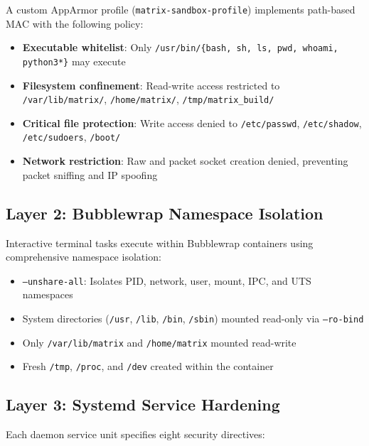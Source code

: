 \documentclass[conference]{IEEEtran}
\begin{document}
A custom AppArmor profile (\texttt{matrix-sandbox-profile}) implements path-based MAC with the following policy:

\begin{itemize}
    \item \textbf{Executable whitelist}: Only \texttt{/usr/bin/\{bash, sh, ls, pwd, whoami, python3*\}} may execute
    \item \textbf{Filesystem confinement}: Read-write access restricted to \texttt{/var/lib/matrix/}, \texttt{/home/matrix/}, \texttt{/tmp/matrix\_build/}
    \item \textbf{Critical file protection}: Write access denied to \texttt{/etc/passwd}, \texttt{/etc/shadow}, \texttt{/etc/sudoers}, \texttt{/boot/}
    \item \textbf{Network restriction}: Raw and packet socket creation denied, preventing packet sniffing and IP spoofing
\end{itemize}

\subsection{Layer 2: Bubblewrap Namespace Isolation}

Interactive terminal tasks execute within Bubblewrap containers using comprehensive namespace isolation:

\begin{itemize}
    \item \texttt{--unshare-all}: Isolates PID, network, user, mount, IPC, and UTS namespaces
    \item System directories (\texttt{/usr}, \texttt{/lib}, \texttt{/bin}, \texttt{/sbin}) mounted read-only via \texttt{--ro-bind}
    \item Only \texttt{/var/lib/matrix} and \texttt{/home/matrix} mounted read-write
    \item Fresh \texttt{/tmp}, \texttt{/proc}, and \texttt{/dev} created within the container
\end{itemize}

\subsection{Layer 3: Systemd Service Hardening}

Each daemon service unit specifies eight security directives:
\end{document}
